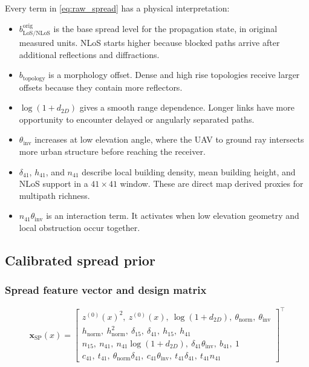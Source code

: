 Every term in \eqref{eq:raw_spread} has a physical interpretation:
\begin{itemize}
\item \(b^{\mathrm{orig}}_{\mathrm{LoS/NLoS}}\) is the base spread level for
      the propagation state, in original measured units. NLoS starts higher
      because blocked paths arrive after additional reflections and
      diffractions.
\item \(b_{\mathrm{topology}}\) is a morphology offset. Dense and high rise
      topologies receive larger offsets because they contain more reflectors.
\item \(\log(1+d_{2D})\) gives a smooth range dependence. Longer links have
      more opportunity to encounter delayed or angularly separated paths.
\item \(\theta_{\mathrm{inv}}\) increases at low elevation angle, where the
      UAV to ground ray intersects more urban structure before reaching the
      receiver.
\item \(\delta_{41}\), \(h_{41}\), and \(n_{41}\) describe local building
      density, mean building height, and NLoS support in a \(41\times41\)
      window. These are direct map derived proxies for multipath richness.
\item \(n_{41}\theta_{\mathrm{inv}}\) is an interaction term. It activates
      when low elevation geometry and local obstruction occur together.
\end{itemize}

\subsection{Calibrated spread prior}

\subsubsection{Spread feature vector and design matrix}

\begingroup
\small
\begin{equation}
\textbf{x}_{\mathrm{SP}}(x) = \begin{bmatrix}
z^{(0)}(x)^2,\ z^{(0)}(x),\ \log(1+d_{2D}),\ \theta_{\mathrm{norm}},\ \theta_{\mathrm{inv}}\\
h_{\mathrm{norm}},\ h_{\mathrm{norm}}^2,\ \delta_{15},\ \delta_{41},\ h_{15},\ h_{41}\\
n_{15},\ n_{41},\ n_{41}\log(1+d_{2D}),\ \delta_{41}\theta_{\mathrm{inv}},\ b_{41},\ 1\\
c_{41},\ t_{41},\ \theta_{\mathrm{norm}}\delta_{41},\ c_{41}\theta_{\mathrm{inv}},\ t_{41}\delta_{41},\ t_{41}n_{41}
\end{bmatrix}^\top
\label{eq:spread_calibration_vector}
\end{equation}
\endgroup


